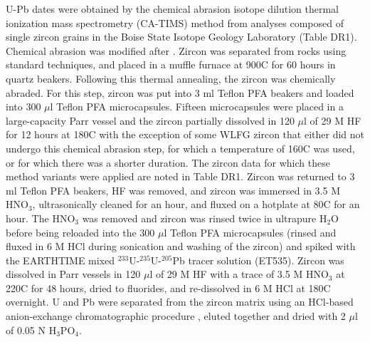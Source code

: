 \documentclass[11pt,letterpaper]{article}
\begin{document}
U-Pb dates were obtained by the chemical abrasion isotope dilution thermal ionization mass spectrometry (CA-TIMS) method from analyses composed of single zircon grains in the Boise State Isotope Geology Laboratory (Table DR1). Chemical abrasion was modified after \cite{Mattinson2005a}. Zircon was separated from rocks using standard techniques, and placed in a muffle furnace at 900\textdegree C for 60 hours in quartz beakers. Following this thermal annealing, the zircon was chemically abraded. For this step, zircon was put into 3 ml Teflon PFA beakers and loaded into 300 $\mu$l Teflon PFA microcapsules. Fifteen microcapsules were placed in a large-capacity Parr vessel and the zircon partially dissolved in 120 $\mu$l of 29 M HF for 12 hours at 180\textdegree C with the exception of some WLFG zircon that either did not undergo this chemical abrasion step, for which a temperature of 160\textdegree C was used, or for which there was a shorter duration. The zircon data for which these method variants were applied are noted in Table DR1. Zircon was returned to 3 ml Teflon PFA beakers, HF was removed, and zircon was immersed in 3.5 M HNO$_\mathrm{3}$, ultrasonically cleaned for an hour, and fluxed on a hotplate at 80\textdegree C for an hour. The HNO$_\mathrm{3}$ was removed and zircon was rinsed twice in ultrapure H$_\mathrm{2}$O before being reloaded into the 300 $\mu$l Teflon PFA microcapsules (rinsed and fluxed in 6 M HCl during sonication and washing of the zircon) and spiked with the EARTHTIME mixed $^{233}$U-$^{235}$U-$^{205}$Pb tracer solution (ET535). Zircon was dissolved in Parr vessels in 120 $\mu$l of 29 M HF with a trace of 3.5 M HNO$_\mathrm{3}$ at 220\textdegree C for 48 hours, dried to fluorides, and re-dissolved in 6 M HCl at 180\textdegree C overnight. U and Pb were separated from the zircon matrix using an HCl-based anion-exchange chromatographic procedure \citep{Krogh1973a}, eluted together and dried with 2 $\mu$l of 0.05 N H$_\mathrm{3}$PO$_\mathrm{4}$.
\end{document}
